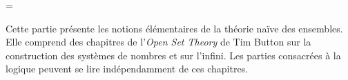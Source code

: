 \documentclass[../../include/open-logic-part]{subfiles}
\begin{document}
\begingroup\newbox\OLSetTheoryNoticeBox
\setbox\OLSetTheoryNoticeBox=\vbox\bgroup
\begin{editorial}
  Cette partie présente les notions élémentaires de la théorie naïve des ensembles.
  Elle comprend des chapitres de l'\emph{Open Set Theory} de Tim Button sur la construction
  des systèmes de nombres et sur l'infini. Les parties consacrées à la logique peuvent se lire indépendamment de ces chapitres.
\end{editorial}
\egroup\let\OLSetTheoryAfterPartSkip\afterpartskip
\renewcommand*{\afterpartskip}{\ifdim\ht\OLSetTheoryNoticeBox>0pt\relax\par\bigskip\unvbox\OLSetTheoryNoticeBox\fi\OLSetTheoryAfterPartSkip}
\endgroup







\OLEndPartHook
\end{document}
